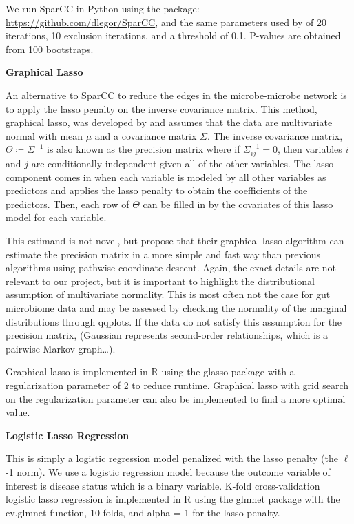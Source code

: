 \documentclass[12pt,letterpaper]{article}
\begin{document}
We run SparCC in Python using the package: \url{https://github.com/dlegor/SparCC}, and the same parameters used by \citep{friedman2012sparcc, zhou2019t2d} of 20 iterations, 10 exclusion iterations, and a threshold of 0.1. P-values are obtained from 100 bootstraps. \newline

\textbf{Graphical Lasso}

An alternative to SparCC to reduce the edges in the microbe-microbe network is to apply the lasso penalty on the inverse covariance matrix. This method, graphical lasso, was developed by \citep{friedman2007glasso} and assumes that the data are multivariate normal with mean $\mu$ and a covariance matrix $\Sigma$. The inverse covariance matrix, $\Theta \coloneq \Sigma^{-1}$ is also known as the precision matrix where if $\Sigma_{ij}^{-1} = 0$, then variables $i$ and $j$ are conditionally independent given all of the other variables. The lasso component comes in when each variable is modeled by all other variables as predictors and applies the lasso penalty to obtain the coefficients of the predictors. Then, each row of $\Theta$ can be filled in by the covariates of this lasso model for each variable. 

This estimand is not novel, but \citep{friedman2007glasso} propose that their graphical lasso algorithm can estimate the precision matrix in a more simple and fast way than previous algorithms using pathwise coordinate descent. Again, the exact details are not relevant to our project, but it is important to highlight the distributional assumption of multivariate normality. This is most often not the case for gut microbiome data and may be assessed by checking the normality of the marginal distributions through qqplots. If the data do not satisfy this assumption for the precision matrix, (Gaussian represents second-order relationships, which is a pairwise Markov graph…).

Graphical lasso is implemented in R using the glasso package with a regularization parameter of 2 to reduce runtime. Graphical lasso with grid search on the regularization parameter can also be implemented to find a more optimal value. \newline

\textbf{Logistic Lasso Regression}

This is simply a logistic regression model penalized with the lasso penalty (the $\ell$-1 norm). We use a logistic regression model because the outcome variable of interest is disease status which is a binary variable. K-fold cross-validation logistic lasso regression is implemented in R using the glmnet package with the cv.glmnet function, 10 folds, and alpha = 1 for the lasso penalty.
\end{document}
